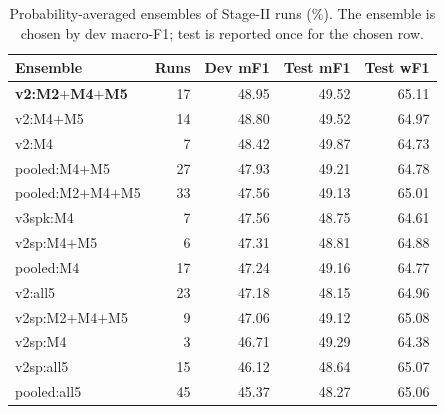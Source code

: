 \begin{table}[t]
\centering
\caption{Probability-averaged ensembles of Stage-II runs (\%). The ensemble is chosen by dev macro-F1; test is reported once for the chosen row.}
\label{tab:ensemble}
\begin{tabular}{lrrrr}
\toprule
Ensemble & Runs & Dev mF1 & Test mF1 & Test wF1 \\
\midrule
\textbf{v2:M2$+$M4$+$M5} & 17 & 48.95 & 49.52 & 65.11 \\
v2:M4$+$M5 & 14 & 48.80 & 49.52 & 64.97 \\
v2:M4 & 7 & 48.42 & 49.87 & 64.73 \\
pooled:M4$+$M5 & 27 & 47.93 & 49.21 & 64.78 \\
pooled:M2$+$M4$+$M5 & 33 & 47.56 & 49.13 & 65.01 \\
v3spk:M4 & 7 & 47.56 & 48.75 & 64.61 \\
v2sp:M4$+$M5 & 6 & 47.31 & 48.81 & 64.88 \\
pooled:M4 & 17 & 47.24 & 49.16 & 64.77 \\
v2:all5 & 23 & 47.18 & 48.15 & 64.96 \\
v2sp:M2$+$M4$+$M5 & 9 & 47.06 & 49.12 & 65.08 \\
v2sp:M4 & 3 & 46.71 & 49.29 & 64.38 \\
v2sp:all5 & 15 & 46.12 & 48.64 & 65.07 \\
pooled:all5 & 45 & 45.37 & 48.27 & 65.06 \\
\bottomrule
\end{tabular}
\end{table}
